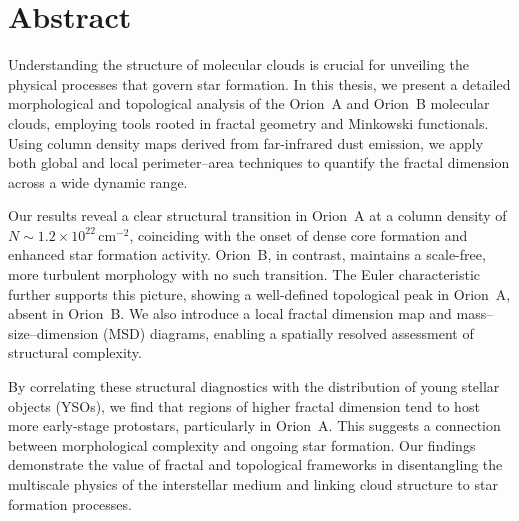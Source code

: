 \chapter{Abstract}

Understanding the structure of molecular clouds is crucial for unveiling the physical processes that govern star formation. In this thesis, we present a detailed morphological and topological analysis of the Orion~A and Orion~B molecular clouds, employing tools rooted in fractal geometry and Minkowski functionals. Using column density maps derived from far-infrared dust emission, we apply both global and local perimeter–area techniques to quantify the fractal dimension across a wide dynamic range. 

Our results reveal a clear structural transition in Orion~A at a column density of $N \sim 1.2 \times 10^{22} \,\mathrm{cm}^{-2}$, coinciding with the onset of dense core formation and enhanced star formation activity. Orion~B, in contrast, maintains a scale-free, more turbulent morphology with no such transition. The Euler characteristic further supports this picture, showing a well-defined topological peak in Orion~A, absent in Orion~B. We also introduce a local fractal dimension map and mass–size–dimension (MSD) diagrams, enabling a spatially resolved assessment of structural complexity.

By correlating these structural diagnostics with the distribution of young stellar objects (YSOs), we find that regions of higher fractal dimension tend to host more early-stage protostars, particularly in Orion~A. This suggests a connection between morphological complexity and ongoing star formation. Our findings demonstrate the value of fractal and topological frameworks in disentangling the multiscale physics of the interstellar medium and linking cloud structure to star formation processes.


